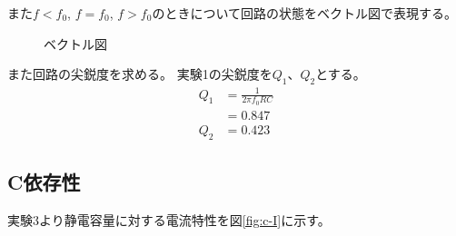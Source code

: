 \documentclass[11pt,a4paper,fleqn]{jsarticle}
\begin{document}
また$f<f_{0}$, $f=f_{0}$, $f>f_{0}$のときについて回路の状態をベクトル図で表現する。

\begin{figure}[H]
\caption{ベクトル図}
\end{figure}

また回路の尖鋭度を求める。
実験1の尖鋭度を$Q_{1}$、$Q_{2}$とする。
\begin{align}
Q_{1}&=\frac{1}{2\pi f_{0}RC}\nonumber\\
&=0.847\\
Q_{2}&=0.423\
\end{align}
\subsection{C依存性}
実験3より静電容量に対する電流特性を図\ref{fig:c-I}に示す。
\begin{figure}[H]
\end{figure}
%
\end{document}
